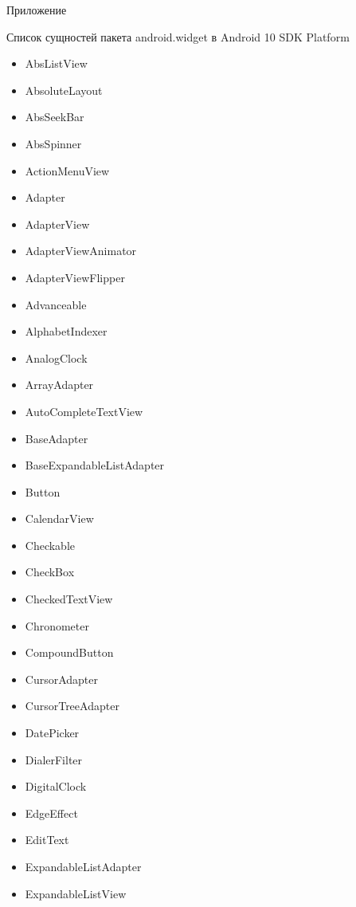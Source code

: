 \documentclass[a4paper,14pt]{extarticle} %
\begin{document}
	\newpage
	\begin{flushright}
		\label{appendix}
		Приложение\par
		Список сущностей пакета android.widget в Android 10 SDK Platform
	\end{flushright}

	\begin{itemize}
        \item AbsListView
        \item AbsoluteLayout
        \item AbsSeekBar
        \item AbsSpinner
        \item ActionMenuView
        \item Adapter
        \item AdapterView
        \item AdapterViewAnimator
        \item AdapterViewFlipper
        \item Advanceable
        \item AlphabetIndexer
        \item AnalogClock
        \item ArrayAdapter
        \item AutoCompleteTextView
        \item BaseAdapter
        \item BaseExpandableListAdapter
        \item Button
        \item CalendarView
        \item Checkable
        \item CheckBox
        \item CheckedTextView
        \item Chronometer
        \item CompoundButton
        \item CursorAdapter
        \item CursorTreeAdapter
        \item DatePicker
        \item DialerFilter
        \item DigitalClock
        \item EdgeEffect
        \item EditText
        \item ExpandableListAdapter
        \item ExpandableListView

\end{itemize}
\end{document}
